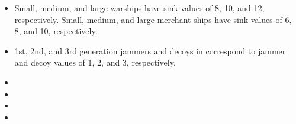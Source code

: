 \begin{itemize}
\item {} Small, medium, and large warships have sink values of 8, 10, and 12, respectively. Small, medium, and large merchant ships have sink values of 6, 8, and 10, respectively.
\item {} 1st, 2nd, and 3rd generation jammers and decoys in {\Harpoon} correspond to jammer and decoy values of 1, 2, and 3, respectively.
\item {} 
\item {} 
\item {} 
\item {} 
\end{itemize}
